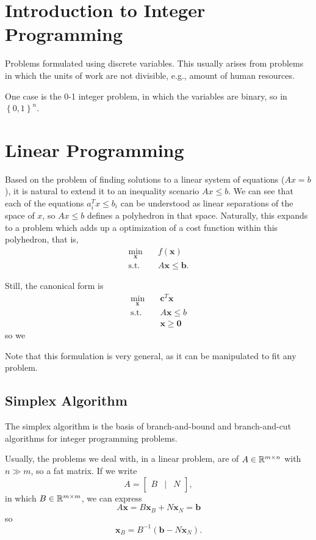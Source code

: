 
\section*{Introduction to Integer Programming}

Problems formulated using discrete variables. This usually arises from problems in which the units of work are not divisible, e.g., amount of human resources.

One case is the 0-1 integer problem, in which the variables are binary, so in $\left\{ 0,1 \right\} ^{n}$.

\section*{Linear Programming}

Based on the problem of finding solutions to a linear system of equations ($Ax = b$), it is natural to extend it to an inequality scenario $Ax \le b$. We can see that each of the equations $a_i^{T}x\le b_i$ can be understood as linear separations of the space of $x$, so $Ax \le b$ defines a polyhedron in that space. Naturally, this expands to a problem which adds up a optimization of a cost function within this polyhedron, that is,
\begin{align*}
    \min_{\bm{x}} \quad & f\left( \bm{x} \right) \\
    \textrm{s.t.} \quad & A \bm{x} \le  \bm{b}
.\end{align*}

Still, the canonical form is
\begin{align*}
    \min_{\bm{x}} \quad & \bm{c}^{T}\bm{x} \\
    \textrm{s.t.} \quad & A\bm{x}\le b \\
      & \bm{x}\ge \bm{0}
\end{align*}
so we 

Note that this formulation is very general, as it can be manipulated to fit any problem.

\subsection*{Simplex Algorithm}

The simplex algorithm is the basis of branch-and-bound and branch-and-cut algorithms for integer programming problems.

Usually, the problems we deal with, in a linear problem, are of $A\in \mathbb{R}^{m\times n}$ with $n\gg m$, so a fat matrix. If we write \[
    A = \begin{bmatrix} B & | & N \end{bmatrix} 
,\] in which $B\in \mathbb{R}^{m\times m}$, we can express \[
A\bm{x} = B \bm{x}_B + N \bm{x}_N = \bm{b}
\] so \[
\bm{x}_B = B^{-1}\left( \bm{b} - N \bm{x}_N \right) 
.\] 

